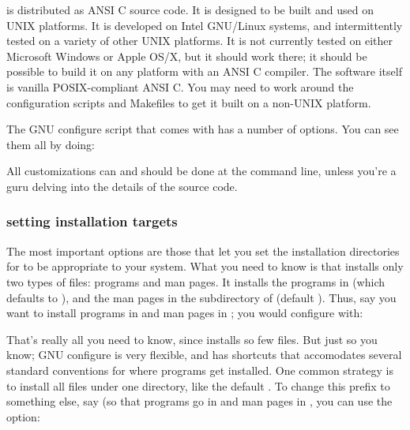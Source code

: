  is distributed as ANSI C source code.  It is
designed to be built and used on UNIX platforms. It is developed on
Intel GNU/Linux systems, and intermittently tested on a variety of
other UNIX platforms. It is not currently tested on either Microsoft
Windows or Apple OS/X, but it should work there; it should be possible
to build it on any platform with an ANSI C compiler. The software
itself is vanilla POSIX-compliant ANSI C. You may need to work around
the configuration scripts and Makefiles to get it built on a non-UNIX
platform.

The GNU configure script that comes with  has a
number of options. You can see them all by doing:


All customizations can and should be done at the 
command line, unless you're a guru delving into the details of the
source code.

\subsubsection{setting installation targets}

The most important options are those that let you set the installation
directories for  to be appropriate to your system.
What you need to know is that  installs only two
types of files: programs and man pages. It installs the programs in
 (which defaults to ), and the man pages in the
 subdirectory of  (default
). Thus, say you want  to install programs
in  and man pages in
; you would configure with:


That's really all you need to know, since  installs
so few files. But just so you know; GNU configure is very flexible,
and has shortcuts that accomodates several standard conventions for
where programs get installed. One common strategy is to install all
files under one directory, like the default . To
change this prefix to something else, say 
(so that programs go in  and man pages in
, you can use the 
option:


